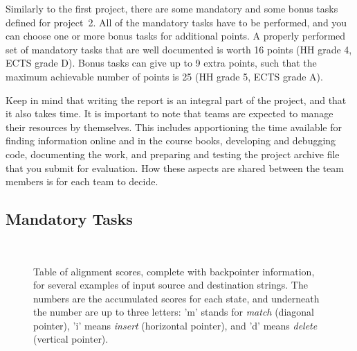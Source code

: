\documentclass[a4paper,10pt]{article}
\begin{document}
Similarly to the first project, there are some mandatory and some bonus tasks defined for project~2.
All of the mandatory tasks have to be performed, and you can choose one or more bonus tasks for additional points.
A properly performed set of mandatory tasks that are well documented is worth 16 points (HH grade 4, ECTS grade D).
Bonus tasks can give up to 9 extra points, such that the maximum achievable number of points is 25 (HH grade 5, ECTS grade A).

Keep in mind that writing the report is an integral part of the project, and that it also takes time.
It is important to note that teams are expected to manage their resources by themselves.
This includes apportioning the time available for finding information online and in the course books, developing and debugging code, documenting the work, and preparing and testing the project archive file that you submit for evaluation.
How these aspects are shared between the team members is for each team to decide.

\subsection{Mandatory Tasks}

\begin{figure}
  \fbox{\begin{minipage}{55mm}
      \footnotesize
      
  \end{minipage}}\hfill
  \fbox{\begin{minipage}{32mm}
      \footnotesize
      
  \end{minipage}}\hfill
  \fbox{\begin{minipage}{32mm}
      \footnotesize
      
  \end{minipage}}\\[\baselineskip]
  \fbox{\begin{minipage}{\columnwidth}
      \footnotesize
      
  \end{minipage}}
  \caption{
    Table of alignment scores, complete with backpointer information, for several examples of input source and destination strings.
    The numbers are the accumulated scores for each state, and underneath the number are up to three letters:
    'm' stands for \emph{match} (diagonal pointer),
    'i' means \emph{insert} (horizontal pointer),
    and 'd' means \emph{delete} (vertical pointer).
  }\label{fig:example-tables}
\end{figure}
\end{document}
